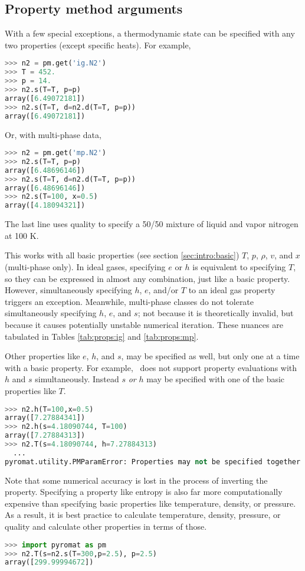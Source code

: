 \subsection{Property method arguments}

With a few special exceptions, a thermodynamic state can be specified with any two properties (except specific heats).  For example,
\begin{lstlisting}[language=Python]
>>> n2 = pm.get('ig.N2')
>>> T = 452.
>>> p = 14.
>>> n2.s(T=T, p=p)
array([6.49072181])
>>> n2.s(T=T, d=n2.d(T=T, p=p))
array([6.49072181])
\end{lstlisting}
Or, with multi-phase data,
\begin{lstlisting}[language=Python]
>>> n2 = pm.get('mp.N2')
>>> n2.s(T=T, p=p)
array([6.48696146])
>>> n2.s(T=T, d=n2.d(T=T, p=p))
array([6.48696146])
>>> n2.s(T=100, x=0.5)
array([4.18094321])
\end{lstlisting}
The last line uses quality to specify a 50/50 mixture of liquid and vapor nitrogen at 100 K.

This works with all basic properties (see section \ref{sec:intro:basic}) $T$, $p$, $\rho$, $v$, and $x$ (multi-phase only).  In ideal gases, specifying $e$ or $h$ is equivalent to specifying $T$, so they can be expressed in almost any combination, just like a basic property.  However, simultaneously specifying $h$, $e$, and/or $T$ to an ideal gas property triggers an exception.  Meanwhile, multi-phase classes do not tolerate simultaneously specifying $h$, $e$, and $s$; not because it is theoretically invalid, but because it causes potentially unstable numerical iteration.  These nuances are tabulated in Tables \ref{tab:props:ig} and \ref{tab:props:mp}.

Other properties like $e$, $h$, and $s$, may be specified as well, but only one at a time with a basic property.  For example, \PM\ does not support property evaluations with $h$ and $s$ simultaneously.  Instead $s$ \emph{or} $h$ may be specified with one of the basic properties like $T$.
\begin{lstlisting}[language=Python]
>>> n2.h(T=100,x=0.5)
array([7.27884341])
>>> n2.h(s=4.18090744, T=100)
array([7.27884313])
>>> n2.T(s=4.18090744, h=7.27884313)
  ...
pyromat.utility.PMParamError: Properties may not be specified together: s, h
\end{lstlisting}

Note that some numerical accuracy is lost in the process of inverting the property.  Specifying a property like entropy is also far more computationally expensive than specifying basic properties like temperature, density, or pressure.  As a result, it is best practice to calculate temperature, density, pressure, or quality and calculate other properties in terms of those.
\begin{lstlisting}[language=Python]
>>> import pyromat as pm
>>> n2.T(s=n2.s(T=300,p=2.5), p=2.5)
array([299.99994672])
\end{lstlisting}

